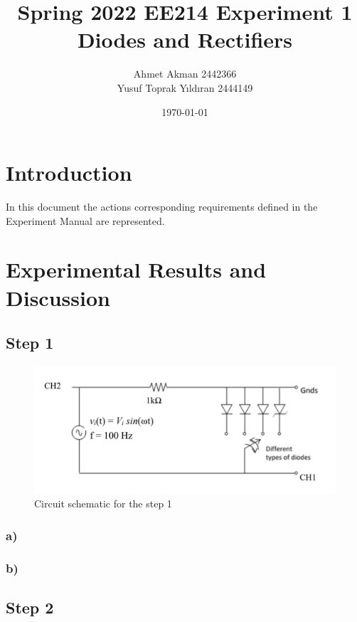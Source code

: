 \documentclass[letterpaper,12pt]{article}
\begin{document}
\title{Spring 2022 EE214 Experiment 1  \protect\\ Diodes and Rectifiers}
\author{Ahmet Akman 2442366 \protect\\ Yusuf Toprak Yıldıran 2444149}
\date{\today}
\maketitle
\tableofcontents
\section{Introduction}
In this document the actions corresponding requirements defined in the Experiment Manual are  represented.

\section{Experimental Results and Discussion}

\subsection{Step 1}

\begin{figure}[H]
\centering
\includegraphics[width=1\textwidth]{1_1.png}
\caption{Circuit schematic for the step 1}
\end{figure} 

\subsubsection{a)}
\subsubsection{b)}

\subsection{Step 2}
\end{document}
